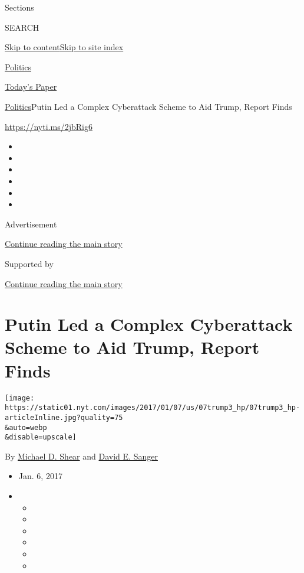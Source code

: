 Sections

SEARCH

\protect\hyperlink{site-content}{Skip to
content}\protect\hyperlink{site-index}{Skip to site index}

\href{https://www.nytimes.com/section/politics}{Politics}

\href{https://myaccount.nytimes.com/auth/login?response_type=cookie\&client_id=vi}{}

\href{https://www.nytimes.com/section/todayspaper}{Today's Paper}

\href{/section/politics}{Politics}\textbar{}Putin Led a Complex
Cyberattack Scheme to Aid Trump, Report Finds

\url{https://nyti.ms/2jbRig6}

\begin{itemize}
\item
\item
\item
\item
\item
\item
\end{itemize}

Advertisement

\protect\hyperlink{after-top}{Continue reading the main story}

Supported by

\protect\hyperlink{after-sponsor}{Continue reading the main story}

\hypertarget{putin-led-a-complex-cyberattack-scheme-to-aid-trump-report-finds}{%
\section{Putin Led a Complex Cyberattack Scheme to Aid Trump, Report
Finds}\label{putin-led-a-complex-cyberattack-scheme-to-aid-trump-report-finds}}

\texttt{[image: https://static01.nyt.com/images/2017/01/07/us/07trump3\_hp/07trump3\_hp-articleInline.jpg?quality=75\\\&auto=webp\\\&disable=upscale]}

By \href{http://www.nytimes.com/by/michael-d-shear}{Michael D. Shear}
and \href{http://www.nytimes.com/by/david-e-sanger}{David E. Sanger}

\begin{itemize}
\item
  Jan. 6, 2017
\item
  \begin{itemize}
  \item
  \item
  \item
  \item
  \item
  \item
  \end{itemize}
\end{itemize}

